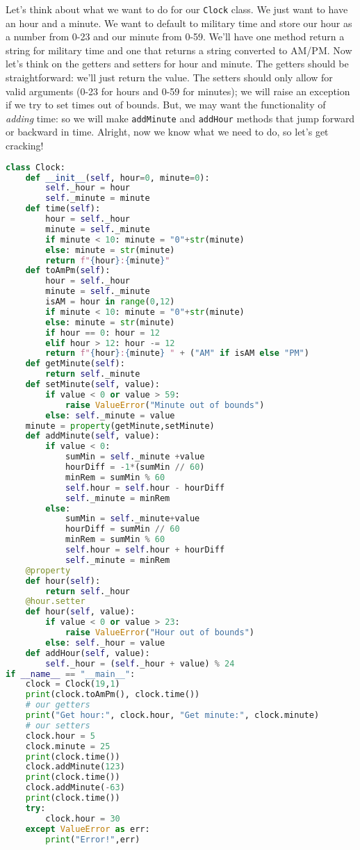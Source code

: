 \documentclass[12pt, twoside, reqno]{book}
\begin{document}
Let's think about what we want to do for our \texttt{Clock} class. We just want to have an hour and a minute. We want to default to military time and store our hour as a number from 0-23 and our minute from 0-59. We'll have one method return a string for military time and one that returns a string converted to AM/PM. Now let's think on the getters and setters for hour and minute. The getters should be straightforward: we'll just return the value. The setters should only allow for valid arguments (0-23 for hours and 0-59 for minutes); we will raise an exception if we try to set times out of bounds. But, we may want the functionality of \textit{adding} time: so we will make \texttt{addMinute} and \texttt{addHour} methods that jump forward or backward in time. Alright, now we know what we need to do, so let's get cracking!
\begin{lstlisting}[language=Python]
class Clock:
    def __init__(self, hour=0, minute=0):
        self._hour = hour
        self._minute = minute
    def time(self):
        hour = self._hour
        minute = self._minute
        if minute < 10: minute = "0"+str(minute)
        else: minute = str(minute)
        return f"{hour}:{minute}"
    def toAmPm(self):
        hour = self._hour
        minute = self._minute
        isAM = hour in range(0,12)
        if minute < 10: minute = "0"+str(minute)
        else: minute = str(minute)
        if hour == 0: hour = 12
        elif hour > 12: hour -= 12
        return f"{hour}:{minute} " + ("AM" if isAM else "PM")
    def getMinute(self):
        return self._minute
    def setMinute(self, value):
        if value < 0 or value > 59:
            raise ValueError("Minute out of bounds")
        else: self._minute = value
    minute = property(getMinute,setMinute)
    def addMinute(self, value):
        if value < 0:
            sumMin = self._minute +value
            hourDiff = -1*(sumMin // 60)
            minRem = sumMin % 60
            self.hour = self.hour - hourDiff
            self._minute = minRem
        else:
            sumMin = self._minute+value
            hourDiff = sumMin // 60
            minRem = sumMin % 60
            self.hour = self.hour + hourDiff
            self._minute = minRem
    @property
    def hour(self):
        return self._hour
    @hour.setter
    def hour(self, value):
        if value < 0 or value > 23:
            raise ValueError("Hour out of bounds")           
        else: self._hour = value
    def addHour(self, value):
        self._hour = (self._hour + value) % 24
if __name__ == "__main__":
    clock = Clock(19,1)
    print(clock.toAmPm(), clock.time())
    # our getters
    print("Get hour:", clock.hour, "Get minute:", clock.minute)
    # our setters
    clock.hour = 5
    clock.minute = 25
    print(clock.time())
    clock.addMinute(123)
    print(clock.time())
    clock.addMinute(-63)
    print(clock.time())
    try:
        clock.hour = 30
    except ValueError as err:
        print("Error!",err)
\end{lstlisting}
\end{document}
